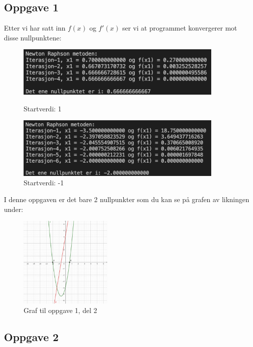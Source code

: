 \subsection{Oppgave 1}
Etter vi har satt inn $f(x)$ og $f'(x)$ ser vi at programmet konvergerer mot disse nullpunktene:
\begin{figure}[h!]
    \centering
    \begin{minipage}{0.45\textwidth}
        \centering
        \includegraphics[width=0.9\textwidth]{Figures/del2_1_2.png}
        \caption{Startverdi: 1}
    \end{minipage}\hfill
    \begin{minipage}{0.45\textwidth}
        \centering
        \includegraphics[width=0.9\textwidth]{Figures/del2_1_1.png}
        \caption{Startverdi: -1}
    \end{minipage}
\end{figure}
\newpage
I denne oppgaven er det bare 2 nullpunkter som du kan se på grafen av likningen under:

\begin{figure}[h!]
    \centering
    \includegraphics[width=0.40\textwidth]{Figures/Del2_1.png}
    \caption{Graf til oppgave 1, del 2}
    \label{fig:my_label}
\end{figure}

\subsection{Oppgave 2}
